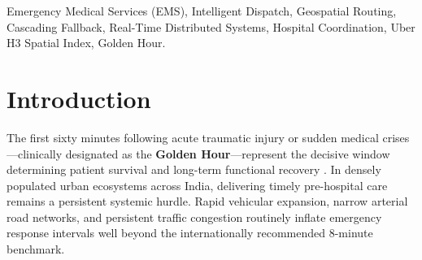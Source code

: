 \documentclass[conference]{IEEEtran}
\begin{document}
\begin{IEEEkeywords}
Emergency Medical Services (EMS), Intelligent Dispatch, Geospatial Routing, Cascading Fallback, Real-Time Distributed Systems, Hospital Coordination, Uber H3 Spatial Index, Golden Hour.
\end{IEEEkeywords}

\section{Introduction}
The first sixty minutes following acute traumatic injury or sudden medical crises—clinically designated as the \textbf{Golden Hour}—represent the decisive window determining patient survival and long-term functional recovery \cite{goodsam}. In densely populated urban ecosystems across India, delivering timely pre-hospital care remains a persistent systemic hurdle. Rapid vehicular expansion, narrow arterial road networks, and persistent traffic congestion routinely inflate emergency response intervals well beyond the internationally recommended 8-minute benchmark.
\end{document}
